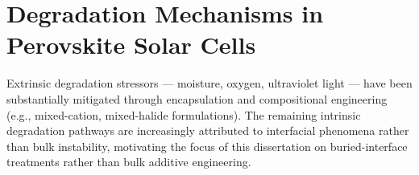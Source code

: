 \section{Degradation Mechanisms in Perovskite Solar Cells}

Extrinsic degradation stressors --- moisture, oxygen, ultraviolet light ---
have been substantially mitigated through encapsulation and compositional
engineering (e.g., mixed-cation, mixed-halide formulations). The remaining
intrinsic degradation pathways are increasingly attributed to interfacial
phenomena rather than bulk instability, motivating the focus of this
dissertation on buried-interface treatments rather than bulk additive
engineering.
